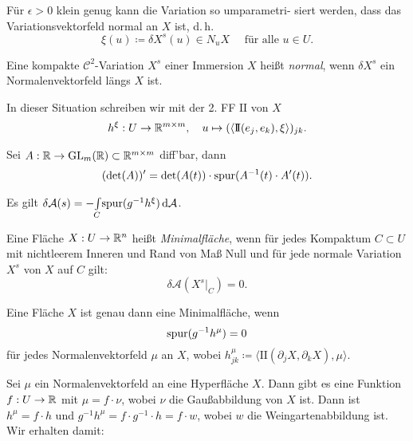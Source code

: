 \documentclass{cheat-sheet}
\newcommand{\II}{\mathrm{I\!I}}
\newcommand{\A}{\mathcal{A}}
\begin{document}
\begin{lem}
  Für $\epsilon > 0$ klein genug kann die Variation so umparametri- siert werden, dass das Variationsvektorfeld normal an $X$ ist, d.\,h.
  \[ \xi(u) \coloneqq \delta X^s(u) \in N_u X \quad \text{ für alle } u \in U. \]
\end{lem}

\begin{definition}
  Eine kompakte $\mathcal{C}^2$-Variation $X^s$ einer Immersion $X$ heißt \emph{normal}, wenn $\delta X^s$ ein Normalenvektorfeld längs $X$ ist.
\end{definition}

\begin{definition}
  In dieser Situation schreiben wir mit der 2. FF $\II$ von $X$
  \[ h^\xi : U \to \R^{m \times m}, \quad u \mapsto (\langle \II(e_j, e_k), \xi \rangle)_{jk}. \]
\end{definition}

\begin{lem}
  Sei $A : \mathbb{R} \to \mathrm{GL}_m(\mathbb{R}) \subset \mathbb{R}^{m \times m}$ diff'bar, dann
  \[ (\det(A))' = \det(A(t)) \cdot \mathrm{spur}(A^{-1}(t) \cdot A'(t)). \]
\end{lem}

\begin{satz}
  Es gilt $\delta \A(s) = - \Int{C}{}{\spur(g^{-1} h^\xi)}{\A}$.
\end{satz}

\begin{definition}
  Eine Fläche $X : U \to \mathbb{R}^n$ heißt \emph{Minimalfläche}, wenn für jedes Kompaktum $C \subset U$ mit nichtleerem Inneren und Rand von Maß Null und für jede normale Variation $X^s$ von $X$ auf $C$ gilt:
  \[ \delta \A(X^s|_C) = 0. \]
\end{definition}

\begin{satz}
  Eine Fläche $X$ ist genau dann eine Minimalfläche, wenn
  \[ \mathrm{spur}(g^{-1} h^{\mu}) = 0 \]
  für jedes Normalenvektorfeld $\mu$ an $X$, wobei $h^\mu_{jk} \coloneqq \langle \II(\partial_j X, \partial_k X), \mu \rangle$.
\end{satz}

\begin{bem}
  Sei $\mu$ ein Normalenvektorfeld an eine Hyperfläche $X$. Dann gibt es eine Funktion $f : U \to \mathbb{R}$ mit $\mu = f \cdot \nu$, wobei $\nu$ die Gaußabbildung von $X$ ist. Dann ist $h^\mu = f \cdot h$ und $g^{-1} h^{\mu} = f \cdot g^{-1} \cdot h = f \cdot w$, wobei $w$ die Weingartenabbildung ist. Wir erhalten damit:
\end{bem}
\end{document}
